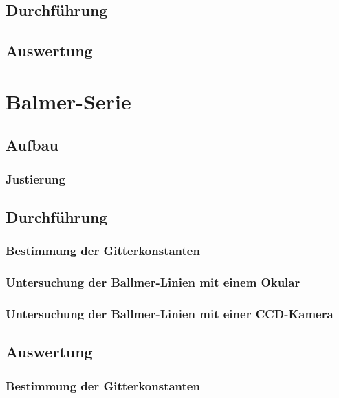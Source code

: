\subsection{Durchführung}

\subsection{Auswertung}

\section{Balmer-Serie}

\subsection{Aufbau}

\subsubsection{Justierung}

\subsection{Durchführung}

\subsubsection{Bestimmung der Gitterkonstanten}

\subsubsection{Untersuchung der Ballmer-Linien mit einem Okular}

\subsubsection{Untersuchung der Ballmer-Linien mit einer CCD-Kamera}

\subsection{Auswertung}

\subsubsection{Bestimmung der Gitterkonstanten}


